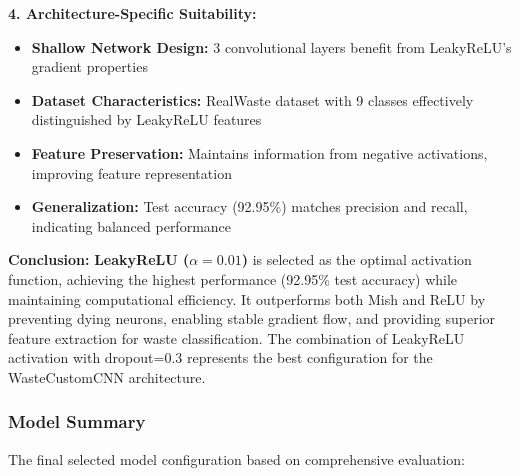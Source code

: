 \documentclass[12pt,a4paper]{article}
\begin{document}
\textbf{4. Architecture-Specific Suitability:}
\begin{itemize}
    \item \textbf{Shallow Network Design:} 3 convolutional layers benefit from LeakyReLU's gradient properties
    \item \textbf{Dataset Characteristics:} RealWaste dataset with 9 classes effectively distinguished by LeakyReLU features
    \item \textbf{Feature Preservation:} Maintains information from negative activations, improving feature representation
    \item \textbf{Generalization:} Test accuracy (92.95\%) matches precision and recall, indicating balanced performance
\end{itemize}

\textbf{Conclusion:} \textbf{LeakyReLU ($\alpha=0.01$)} is selected as the optimal activation function, achieving the highest performance (92.95\% test accuracy) while maintaining computational efficiency. It outperforms both Mish and ReLU by preventing dying neurons, enabling stable gradient flow, and providing superior feature extraction for waste classification. The combination of LeakyReLU activation with dropout=0.3 represents the best configuration for the WasteCustomCNN architecture.

\subsubsection{Model Summary}

The final selected model configuration based on comprehensive evaluation:

\vspace{0.3cm}
\end{document}
